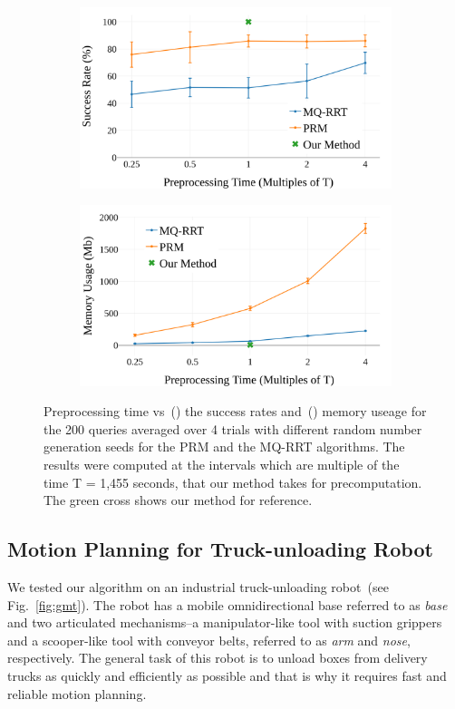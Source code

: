 \documentclass[a4paper]{report}
\begin{document}
\begin{figure}
\begin{subfigure}{0.5\textwidth}
\centering
  \includegraphics[width=0.9\linewidth]{success.png}
  \caption{}
  \label{fig:success}
\end{subfigure}
\hfill
\begin{subfigure}{0.5\textwidth}
\centering
  \includegraphics[width=0.9\linewidth]{memory.png}
  \caption{}
  \label{fig:memory}
\end{subfigure}
    \caption{Preprocessing time vs~() the success rates and~() memory useage for the 200 queries averaged over 4 trials with different random number generation seeds for the PRM and the MQ-RRT algorithms. The results were computed at the intervals which are multiple of the time T = 1,455 seconds, that our method takes for precomputation. The green cross shows our method for reference.}
    \label{fig:plots}
\end{figure}

\subsection{Motion Planning for Truck-unloading Robot}
We tested our algorithm on an industrial truck-unloading robot~(see Fig.~\ref{fig:gmt}). The robot has a mobile omnidirectional base referred to as \textit{base} and two articulated mechanisms--a manipulator-like tool with suction grippers and a  scooper-like tool with conveyor belts, referred to as \textit{arm} and \textit{nose}, respectively. The general task of this robot is to unload boxes from delivery trucks as quickly and efficiently as possible and that is why it requires fast and reliable motion planning.
\end{document}
